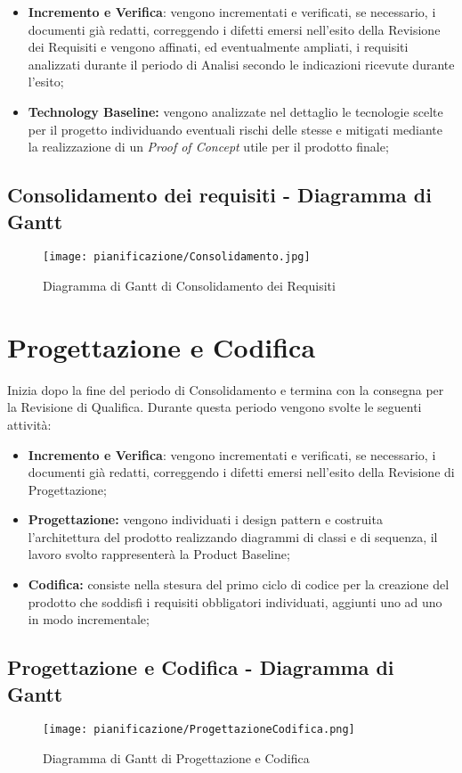 \documentclass[../PianodiProgetto.tex]{subfiles}
\begin{document}
	\begin{itemize}	
		\item \textbf{Incremento e Verifica}: vengono incrementati e verificati, se necessario, i documenti già redatti, correggendo i difetti emersi nell'esito della Revisione dei Requisiti e vengono affinati, ed eventualmente ampliati, i requisiti analizzati durante il periodo di Analisi secondo le indicazioni ricevute durante l'esito;
		\item \textbf{Technology Baseline:} vengono analizzate nel dettaglio le tecnologie scelte per il progetto individuando eventuali rischi delle stesse e mitigati mediante la realizzazione di un \textit{Proof of Concept} utile per il prodotto finale;
	\end{itemize}

	\subsection{Consolidamento dei requisiti - Diagramma di Gantt}
	\begin{figure}[H]
		\texttt{[image: pianificazione/Consolidamento.jpg]}	
		\caption{Diagramma di Gantt di Consolidamento dei Requisiti}\label{fig:2}
	\end{figure}
	\newpage
	\section{Progettazione e Codifica}
	Inizia dopo la fine del periodo di Consolidamento e termina con la consegna per la Revisione di Qualifica. Durante questa periodo vengono svolte le seguenti attività:
	\begin{itemize}
		\item \textbf{Incremento e Verifica}: vengono incrementati e verificati, se necessario, i documenti già redatti, correggendo i difetti emersi nell'esito della Revisione di Progettazione;	
		\item \textbf{Progettazione:} vengono individuati i design pattern e costruita l'architettura del prodotto realizzando diagrammi di classi e di sequenza, il lavoro svolto rappresenterà la Product Baseline;
		\item \textbf{Codifica:} consiste nella stesura del primo ciclo di codice per la creazione del prodotto che soddisfi i requisiti obbligatori individuati, aggiunti uno ad uno in modo incrementale;
	\end{itemize}
	\subsection{Progettazione e Codifica - Diagramma di Gantt}
	\begin{figure}[H]
		\texttt{[image: pianificazione/ProgettazioneCodifica.png]}	
		\caption{Diagramma di Gantt di Progettazione e Codifica}\label{fig:3}	
	\end{figure}
	\newpage
\end{document}
